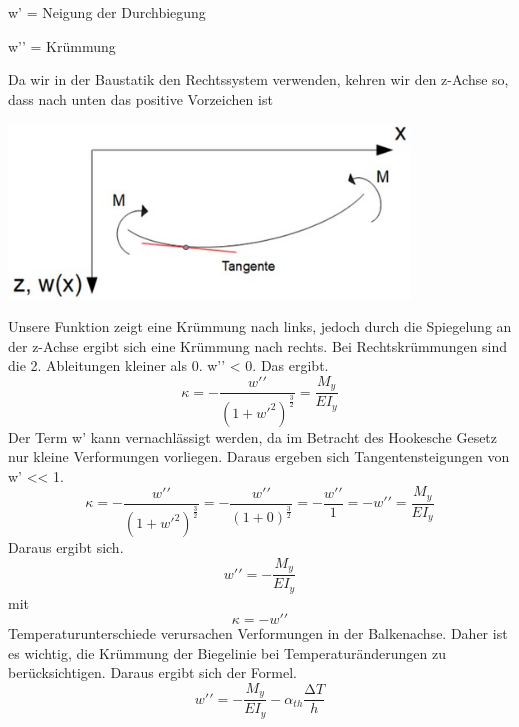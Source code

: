 w’ = Neigung der Durchbiegung

w’’ = Krümmung

Da wir in der Baustatik den Rechtssystem verwenden, kehren wir den z-Achse so, dass nach unten das positive Vorzeichen ist

\begin{center}
	\includegraphics[width=0.8\textwidth]{papers/balken/images/teil2/Biegung_verdrehte_Achsen.jpg}
\end{center}
\label{Abbildung von den verdrehten z-Achse und die positive Momenten, welche auf der Biegelinie wirken.}
Unsere Funktion zeigt eine Krümmung nach links, jedoch durch die Spiegelung an der z-Achse ergibt sich eine Krümmung nach rechts.
Bei Rechtskrümmungen sind die 2. Ableitungen kleiner als 0. w’’ < 0.
Das ergibt.
\begin{equation}
	\kappa=
	-\frac{w\prime\prime}{\left(1+{w\prime}^2\right)^\frac{3}{2}}=
	\frac{M_y}{EI_y}
\end{equation}
Der Term w’ kann vernachlässigt werden, da im Betracht des Hookesche Gesetz nur kleine Verformungen vorliegen.
Daraus ergeben sich Tangentensteigungen von w’ << 1.
\begin{equation}
	\kappa=
	-\frac{w\prime\prime}{\left(1+{w\prime}^2\right)^\frac{3}{2}}=
	-\frac{w\prime\prime}{\left(1+0\right)^\frac{3}{2}}=
	-\frac{w\prime\prime}{1}=-w\prime\prime=
	\frac{M_y}{EI_y}
\end{equation}
Daraus ergibt sich.
\begin{equation}
	w\prime\prime=
	-\frac{M_y}{EI_y}
\end{equation}
mit
\begin{equation}
	\kappa=
	-w\prime\prime
\end{equation}
Temperaturunterschiede verursachen Verformungen in der Balkenachse.
Daher ist es wichtig, die Krümmung der Biegelinie bei Temperaturänderungen zu berücksichtigen.
Daraus ergibt sich der Formel.
\begin{equation}
	w\prime\prime=
	-\frac{M_y}{EI_y}-\alpha_{th}\frac{∆T}{h}
\end{equation}

